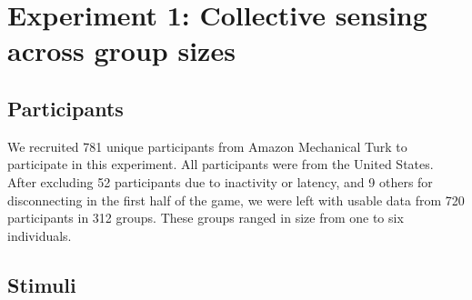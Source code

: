 \documentclass[12pt,letterpaper]{article}
\begin{document}





\section{Experiment 1: Collective sensing across group sizes}

\subsection{Participants}
We recruited 781 unique participants from Amazon Mechanical Turk to participate in this experiment.  All participants were from the United States.  After excluding 52 participants due to inactivity or latency, and 9 others for disconnecting in the first half of the game, we were left with usable data from 720 participants in 312 groups.  These groups ranged in size from one to six individuals. 

\subsection{Stimuli}
\end{document}
